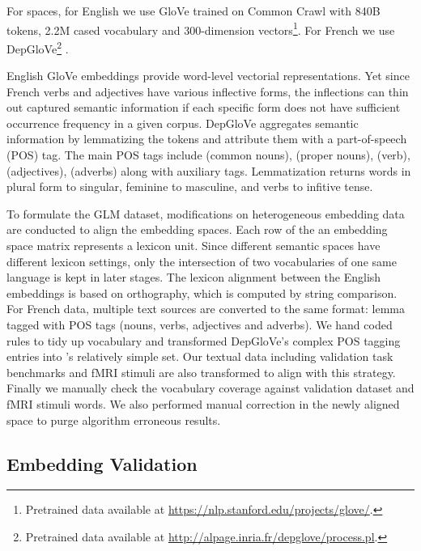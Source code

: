 For  spaces, for English we use GloVe \parencite{penningtonGloveGlobalVectors2014} trained on Common Crawl with 840B tokens, 2.2M cased vocabulary and 300-dimension vectors\footnote{Pretrained data available at \url{https://nlp.stanford.edu/projects/glove/}.}. For French we use DepGloVe\footnote{Pretrained data available at \url{http://alpage.inria.fr/depglove/process.pl}.} \parencite{delaclergerieDepGloveSmallServer}. 

English GloVe embeddings provide word-level vectorial representations. Yet since French verbs and adjectives have various inflective forms, the inflections can thin out captured semantic information if each specific form does not have sufficient occurrence frequency in a given corpus. DepGloVe aggregates semantic information by lemmatizing the tokens and attribute them with a part-of-speech (POS) tag. The main POS tags include  (common nouns),  (proper nouns),  (verb),  (adjectives),  (adverbs) along with auxiliary tags. Lemmatization returns words in plural form to singular, feminine to masculine, and verbs to infitive tense.

To formulate the GLM dataset, modifications on heterogeneous embedding data are conducted to align the embedding spaces. Each row of the an embedding space matrix represents a lexicon unit. Since different semantic spaces have different lexicon settings, only the intersection of two vocabularies of one same language is kept in later stages. The lexicon alignment between the English embeddings is based on orthography, which is computed by string comparison. For French data, multiple text sources are converted to the same format: lemma tagged with  POS tags (nouns, verbs, adjectives and adverbs). We hand coded rules to tidy up  vocabulary and transformed DepGloVe's complex POS tagging entries into 's relatively simple set. Our textual data including validation task benchmarks and fMRI stimuli are also transformed to align with this strategy. Finally we manually check the vocabulary coverage against validation dataset and fMRI stimuli words. We also performed manual correction in the newly aligned space to purge algorithm erroneous results.  %

\subsection{Embedding Validation}

